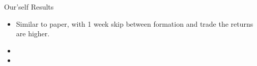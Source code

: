 \documentclass{beamer}
\begin{document}
\begin{frame}{Our'self Results}
	\begin{itemize}
		\item Similar to paper, with 1 week skip between formation and trade the returns are higher.
		\item
		\item
	\end{itemize}
\end{frame}
\end{document}
